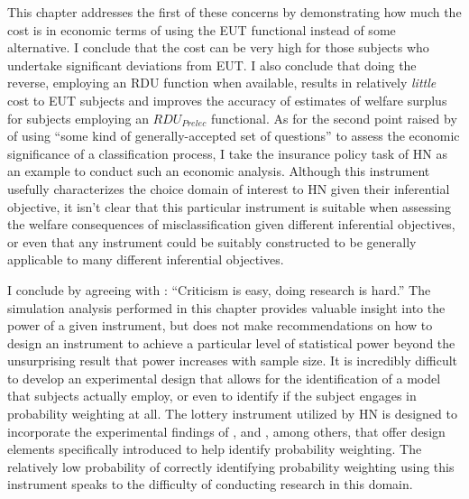 \documentclass[../main.tex]{subfiles}
\begin{document}
This chapter addresses the first of these concerns by demonstrating how much the cost is in economic terms of using the EUT functional instead of some alternative.
I conclude that the cost can be very high for those subjects who undertake significant deviations from EUT.
I also conclude that doing the reverse, employing an RDU function when available, results in relatively \textit{little} cost to EUT subjects and improves the accuracy of estimates of welfare surplus for subjects employing an $\mathit{RDU_{Prelec}}$ functional.
As for the second point raised by \textcite{Hey2001} of using \enquote{some kind of generally-accepted set of questions} to assess the economic significance of a classification process, I take the insurance policy task of HN as an example to conduct such an economic analysis.
Although this instrument usefully characterizes the choice domain of interest to HN given their inferential objective, it isn't clear that this particular instrument is suitable when assessing the welfare consequences of misclassification given different inferential objectives, or even that any instrument could be suitably constructed to be generally applicable to many different inferential objectives.

I conclude by agreeing with \textcite[14]{Gelman2013}: \enquote{Criticism is easy, doing research is hard.}
The simulation analysis performed in this chapter provides valuable insight into the power of a given instrument, but does not make recommendations on how to design an instrument to achieve a particular level of statistical power beyond the unsurprising result that power increases with sample size.
It is incredibly difficult to develop an experimental design that allows for the identification of a model that subjects actually employ, or even to identify if the subject engages in probability weighting at all.
The lottery instrument utilized by HN \parencite*[98-99]{Harrison2016} is designed to incorporate the experimental findings of \textcite{Camerer1989}, \textcite{Harless1992} and \textcite{Loomes1998}, among others, that offer design elements specifically introduced to help identify probability weighting.
The relatively low probability of correctly identifying probability weighting using this instrument speaks to the difficulty of conducting research in this domain.

\onlyinsubfile{
\newpage
\printbibliography[segment=4, heading=subbibliography]
}
\end{document}
